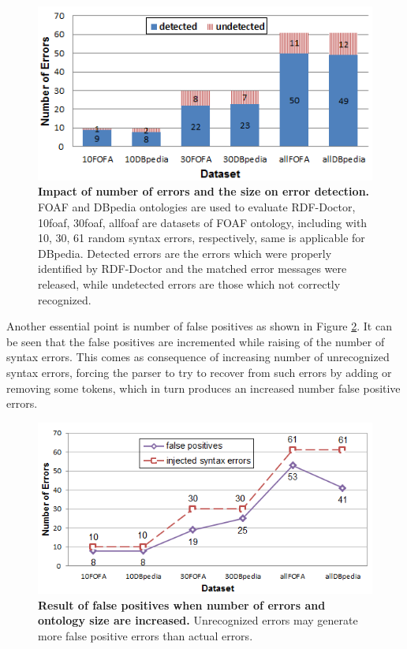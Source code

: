 \begin{figure}[ht]
\begin{center}
		\includegraphics[scale=1,angle=0]{images/Experiment03-01.png}
				\setlength\belowcaptionskip{-5mm}
		\caption{\textbf{Impact of number of errors and the size on error detection.} 
		FOAF and DBpedia ontologies are used to evaluate RDF-Doctor, 10foaf, 30foaf, allfoaf are datasets of FOAF ontology, including with 10, 30, 61 random syntax errors, respectively, same is applicable for DBpedia. Detected errors are the errors which were properly identified by RDF-Doctor and the matched error messages were released, while undetected errors are those which not correctly recognized.}
		\label{Fig:Experiment03-01}

\end{center}
\end{figure}


Another essential point is number of false positives as shown in Figure \ref{Fig:Experiment03-02}. 
It can be seen that the false positives are incremented while raising of the number of syntax errors.
This comes as consequence of increasing number of unrecognized syntax errors, forcing the parser to try to recover from such errors by adding or removing some tokens, which in turn produces an increased number false positive errors.   

\begin{figure}[ht]
\begin{center}
		\includegraphics[scale=0.8,angle=0]{images/Experiment03-02.png}
		\setlength\belowcaptionskip{-5mm}
		\setlength\abovecaptionskip{-50mm}
		\caption{\textbf{Result of false positives when number of errors and ontology size are increased.} Unrecognized errors may generate more false positive errors than actual errors. 
		}
   \label{Fig:Experiment03-02}
\end{center}
\end{figure}


